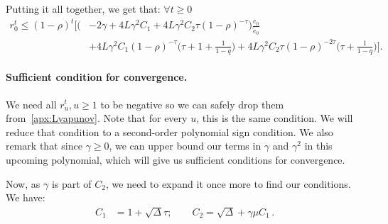 \documentclass[twoside]{article}
\newcommand{\stepsize}{\gamma}
\newcommand{\strongconvex}{\mu}
\newcommand{\overlap}{\tau}
\newcommand{\contraction}{\rho}
\newcommand{\sparsity}{\Delta}
\newcommand{\lipschitz}{L}
\begin{document}
Putting it all together, we get that: $\forall t \geq 0$
\begin{equation} \label{r0t}
\begin{aligned}
r_0^t \leq (1 -\contraction)^t 
	\Big[    \Big( &-2 \stepsize + 
		4\lipschitz\stepsize^2 C_1+4\lipschitz\stepsize^2 C_2 \overlap(1-\contraction)^{-\overlap} \Big) \frac{e_0}{\tilde e_0} \\
		&+4\lipschitz\stepsize^2 C_1 (1 -\contraction)^{-\overlap} \big(\overlap + 1 + \frac{1}{1 -q} \big) 
		+4\lipschitz\stepsize^2 C_2 \overlap (1 -\contraction)^{-2\overlap}\big(\overlap + \frac{1}{1 -q}\big)
	\Big] .
\end{aligned}
\end{equation}

\paragraph{Sufficient condition for convergence.}
We need all $r_u^t, u \geq 1$ to be negative so we can safely drop them from~\eqref{apx:Lyapunov}. 
Note that for every $u$, this is the same condition. 
We will reduce that condition to a second-order polynomial sign condition.
We also remark that since $\stepsize \geq 0$, we can upper bound our terms in $\stepsize$ and $\stepsize^2$ in this upcoming polynomial, which will give us sufficient conditions for convergence.

Now, as $\stepsize$ is part of $C_2$, we need to expand it once more to find our conditions. 
We have:
\begin{align*}
C_1 &= 1 + \sqrt{\sparsity}\overlap ; \qquad
C_2 = \sqrt{\sparsity} + \stepsize\strongconvex C_1  \, .
\end{align*}
\end{document}
